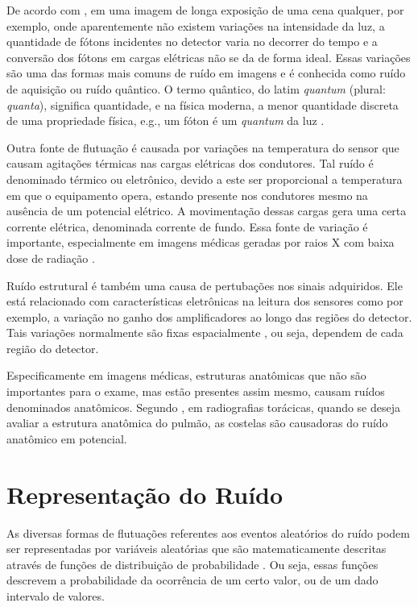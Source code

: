 De acordo com , em uma imagem de longa exposição de uma cena qualquer, por exemplo, onde aparentemente não existem variações na intensidade da luz, a quantidade de fótons incidentes no detector varia no decorrer do tempo e a conversão dos fótons em cargas elétricas não se da de forma ideal. Essas variações são uma das formas mais comuns de ruído em imagens e é conhecida como ruído de aquisição ou ruído quântico. O termo quântico, do latim \textit{quantum} (plural: \textit{quanta}), significa quantidade, e na física moderna, a menor quantidade discreta de uma propriedade física, e.g., um fóton é um \textit{quantum} da luz \cite{bushberg2011essential}. 

Outra fonte de flutuação é causada por variações na temperatura do sensor que causam agitações térmicas nas cargas elétricas dos condutores. Tal ruído é denominado térmico ou eletrônico, devido a este ser proporcional a temperatura em que o equipamento opera, estando presente nos condutores mesmo na ausência de um potencial elétrico. A movimentação dessas cargas gera uma certa corrente elétrica, denominada corrente de fundo. Essa fonte de variação é importante, especialmente em imagens médicas geradas por raios X com baixa dose de radiação \cite{bertalmiodenoising2018}.

Ruído estrutural é também uma causa de pertubações nos sinais adquiridos. Ele está relacionado com características eletrônicas na leitura dos sensores como por exemplo, a variação no ganho dos amplificadores ao longo das regiões do detector. Tais variações normalmente são fixas espacialmente , ou seja, dependem de cada região do detector.

Especificamente em imagens médicas, estruturas anatômicas que não são importantes para o exame, mas estão presentes assim mesmo, causam ruídos denominados anatômicos. Segundo , em radiografias torácicas, quando se deseja avaliar a estrutura anatômica do pulmão, as costelas são causadoras do ruído anatômico em potencial.

 
\section{Representação do Ruído}

As diversas formas de flutuações referentes aos eventos aleatórios do ruído podem ser representadas por variáveis aleatórias que são matematicamente descritas através de funções de distribuição de probabilidade \cite{prince2006medical}. Ou seja, essas funções descrevem a probabilidade da ocorrência de um certo valor, ou de um dado intervalo de valores. 

